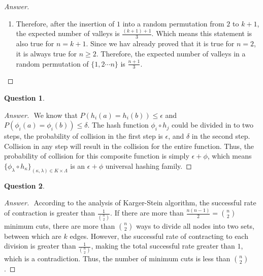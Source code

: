 \documentclass{article}
\theoremstyle{plain}
\newtheorem{question}{Question}
\newenvironment{answer}[1][Answer]
    {\begin{proof}[#1]{$ $}\renewcommand\qedsymbol{$\vartriangle$}}
    {\end{proof}}
\begin{document}
\begin{answer}
\begin{enumerate}
\begin{enumerate}
            \item Therefore, after the insertion of $1$ into a random permutation from $2$ to $k + 1$, the expected number of valleys is $\displaystyle\frac{(k+1) + 1}{3}$. Which means this statement is also true for $n = k + 1$. Since we hav already proved that it is true for $n = 2$, it is always true for $n \geq 2$. Therefore, the expected number of valleys in a random permutation of $\{ 1,2 \cdots n\}$ is $\displaystyle\frac{n+1}{3}$.
        \end{enumerate}
    \end{enumerate}
\end{answer}

\begin{question}
\end{question}
\begin{answer}
    We know that $P(h_i(a) = h_i(b)) \leq \epsilon$ and $P(\phi_i(a) = \phi_i(b)) \leq \delta$. The hash function $\phi_i \circ h_j$ could be divided in to two steps, the probability of collision in the first step is $\epsilon$, and $\delta$ in the second step. Collision in any step will result in the collision for the entire function. Thus, the probability of collision for this composite function is simply $\epsilon + \phi$, which means $\{\phi_\lambda \circ h_\kappa\}_{(\kappa,\lambda) \in K \times \Lambda}$ is an $\epsilon + \phi$ universal hashing family.
\end{answer}

\begin{question}
\end{question}
\begin{answer}
    According to the analysis of Karger-Stein algorithm, the successful rate of contraction is greater than $\displaystyle\frac{1}{\binom{n}{2}}$. If there are more than $\displaystyle\frac{n(n - 1)}{2} = \binom{n}{2}$ minimum cuts, there are more than $\displaystyle\binom{n}{2}$ ways to divide all nodes into two sets, between which are $k$ edges. However, the successful rate of contracting to each division is greater than $\displaystyle\frac{1}{\binom{n}{2}}$, making the total successful rate greater than $1$, which is a contradiction. Thus, the number of minimum cuts is less than $\displaystyle\binom{n}{2}$.

\end{answer}

\end{document}
